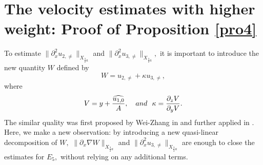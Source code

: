 \documentclass[12pt, reqno]{amsart}
\numberwithin{equation}{section}
\begin{document}
	\section{The velocity estimates with higher weight: Proof of Proposition \ref{pro4}}
	To estimate $\|\partial^2_{x}u_{2,\neq}\|_{X_{\frac{3}{2}a}}$ and 
	$\|\partial_{x}^2u_{3,\neq}\|_{X_{\frac{3}{2}a}},$ it is important to 
	introduce the new quantity $W$ defined by 
	$$W=u_{2,\neq}+\kappa u_{3,\neq},$$
	where $$V=y+\frac{\widehat{u_{1,0}}}{A},\quad{\rm and}~~ \kappa=\frac{\partial_zV}{\partial_yV}.$$
	\textcolor[rgb]{0,0,0}{
		The similar quality was first proposed by Wei-Zhang in \cite{wei2} and further applied in \cite{Chen1}. 
		Here, we make a new observation: by introducing a new quasi-linear decomposition of $W,$  $\|\partial_x\nabla W\|_{X_{\frac{3}{2}a}}$ and $\|\partial_x^2 u_{3,\neq}\|_{X_{\frac{3}{2}a}}$ are enough to close the  estimates for $E_{5},$  without relying on any additional terms.}
	
\end{document}
